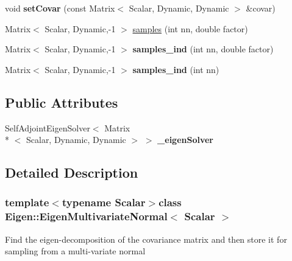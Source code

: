 \begin{DoxyCompactItemize}
\item 
\hypertarget{classEigen_1_1EigenMultivariateNormal_a56942d3a51cf934f85d5b95275da9d18}{void {\bfseries set\-Covar} (const Matrix$<$ Scalar, Dynamic, Dynamic $>$ \&covar)}\label{classEigen_1_1EigenMultivariateNormal_a56942d3a51cf934f85d5b95275da9d18}

\item 
Matrix$<$ Scalar, Dynamic,-\/1 $>$ \hyperlink{classEigen_1_1EigenMultivariateNormal_a0a0c8f8310e6469b3365e735e95c9c87}{samples} (int nn, double factor)
\item 
\hypertarget{classEigen_1_1EigenMultivariateNormal_a957ca8e363a84616c1cb235d595fbfcd}{Matrix$<$ Scalar, Dynamic,-\/1 $>$ {\bfseries samples\-\_\-ind} (int nn, double factor)}\label{classEigen_1_1EigenMultivariateNormal_a957ca8e363a84616c1cb235d595fbfcd}

\item 
\hypertarget{classEigen_1_1EigenMultivariateNormal_ac81198e693bee0a5b350cec5c8293897}{Matrix$<$ Scalar, Dynamic,-\/1 $>$ {\bfseries samples\-\_\-ind} (int nn)}\label{classEigen_1_1EigenMultivariateNormal_ac81198e693bee0a5b350cec5c8293897}

\end{DoxyCompactItemize}
\subsection*{Public Attributes}
\begin{DoxyCompactItemize}
\item 
\hypertarget{classEigen_1_1EigenMultivariateNormal_aceef5dd5ce5aee926fab9f051cd8904b}{Self\-Adjoint\-Eigen\-Solver$<$ Matrix\\*
$<$ Scalar, Dynamic, Dynamic $>$ $>$ {\bfseries \-\_\-eigen\-Solver}}\label{classEigen_1_1EigenMultivariateNormal_aceef5dd5ce5aee926fab9f051cd8904b}

\end{DoxyCompactItemize}


\subsection{Detailed Description}
\subsubsection*{template$<$typename Scalar$>$class Eigen\-::\-Eigen\-Multivariate\-Normal$<$ Scalar $>$}

Find the eigen-\/decomposition of the covariance matrix and then store it for sampling from a multi-\/variate normal 

